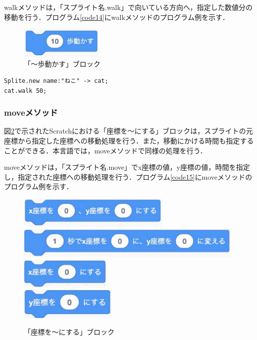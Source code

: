 \documentclass[10pt,a4j]{ltjsarticle}
\begin{document}
walkメソッドは，「スプライト名.walk」で向いている方向へ，指定した数値分の移動を行う．プログラム\ref{code14}にwalkメソッドのプログラム例を示す．

\begin{figure}[H]
  \centering
  \includegraphics[height=15mm]{images/walk.pdf}
  \caption{「〜歩動かす」ブロック}
  \label{fig:walk}
\end{figure}

\begin{lstlisting}[caption=walkメソッドのプログラム例, label=code14]
Splite.new name:"ねこ" -> cat;
cat.walk 50; 
\end{lstlisting}

\subsubsection{moveメソッド}

図\ref{fig:move}で示されたScratchにおける「座標を〜にする」ブロックは，スプライトの元座標から指定した座標への移動処理を行う．また，移動にかける時間も指定することができる．本言語では，moveメソッドで同様の処理を行う．

moveメソッドは，「スプライト名.move」でx座標の値，y座標の値，時間を指定し，指定された座標への移動処理を行う．プログラム\ref{code15}にmoveメソッドのプログラム例を示す．

\begin{figure}[H]
  \centering
  \includegraphics[height=15mm]{images/move_x_y.pdf} \\
  \includegraphics[height=15mm]{images/move_x_y_time.pdf} \\
  \includegraphics[height=15mm]{images/move_x.pdf} \\
  \includegraphics[height=15mm]{images/move_y.pdf} 
  \caption{「座標を〜にする」ブロック}
  \label{fig:move}
\end{figure}
\end{document}
